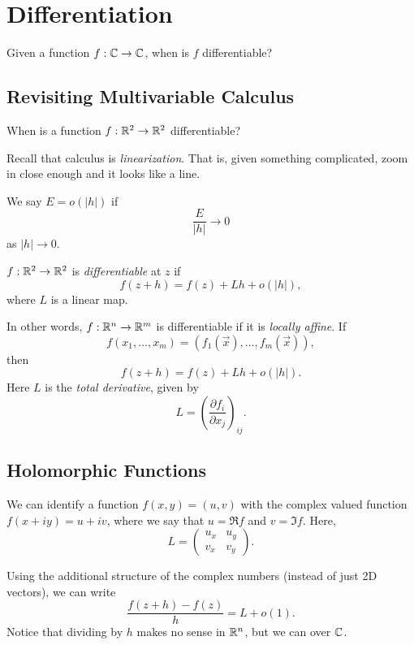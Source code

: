 \chapter{Differentiation}

Given a function $f : \mathbb{C} \to \mathbb{C}$, when is $f$
differentiable?

\section{Revisiting Multivariable Calculus}
When is a function $f : \mathbb{R}^2 \to \mathbb{R}^2$ differentiable?

Recall that calculus is \textit{linearization}. That is,
given something complicated, zoom in close enough and
it looks like a line.

\begin{tcolorbox}[title=Definition (Little-$o$)]
  We say $E = o(|h|)$ if
  \[\frac{E}{|h|} \to 0\]
  as $|h| \to 0$.
\end{tcolorbox}

\begin{tcolorbox}[title=Definition (Differentiability in $\R^2$)]
  $f : \mathbb{R}^2 \to \mathbb{R}^2$ is \textit{differentiable} at
  $z$ if
  \[f(z + h) = f(z) + Lh + o(|h|),\]
  where $L$ is a linear map.
\end{tcolorbox}

In other words, $f : \mathbb{R}^n \to \mathbb{R}^m$ is differentiable if
it is \textit{locally affine}. If
\[
f(x_1, \dots, x_m) = (f_1(\vec{x}), \dots, f_m(\vec{x}))
,\]
then
\[
f(z + h) = f(z) + Lh + o(|h|)
.\] 
Here $L$ is the \textit{total derivative}, given by
\[
  L = \left(\frac{\partial f_i}{\partial x_j}\right)_{ij}
.\]

\section{Holomorphic Functions}
We can identify a function $f(x, y) = (u, v)$ with
the complex valued function $f(x + iy) = u + iv$, where
we say that $u = \Re f$ and $v = \Im f$. Here,
\[
L =
\left(\begin{matrix}
  u_x & u_y \\
  v_x & v_y
\end{matrix}\right)
.\] 

Using the additional structure of the complex numbers
(instead of just 2D vectors), we can write
\[\frac{f(z + h) - f(z)}{h} = L + o(1).\]
Notice that dividing by $h$ makes no sense in $\mathbb{R}^n$, but
we can over $\mathbb{C}$.

